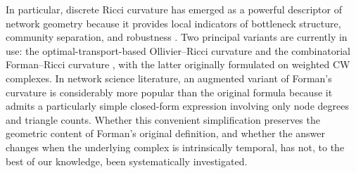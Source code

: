 \documentclass[
    pre,
    twocolumn,
    superscriptaddress,
    showpacs,
    nofootinbib,
    amsmath,
    amssymb,
    floatfix
]{revtex4-2}
\theoremstyle{plain} %
\theoremstyle{definition} %
\begin{document}
In particular, discrete Ricci curvature has emerged as a powerful
descriptor of network geometry because it provides local indicators of
bottleneck structure, community separation, and robustness
\cite{Ollivier2009,Sandhu2016,Sreejith2016,Samal2018}.  Two principal
variants are currently in use: the optimal-transport-based Ollivier--Ricci
curvature \cite{Ollivier2009} and the combinatorial Forman--Ricci
curvature \cite{Forman2003}, with the latter originally formulated on
weighted CW complexes. In network science literature, an
augmented variant of Forman's curvature
\cite{Sreejith2016,Samal2018} is considerably more popular than the original
formula because it admits a particularly simple closed-form expression involving
only node degrees and triangle counts.  Whether this convenient
simplification preserves the geometric content of Forman's original
definition, and whether the answer changes when the underlying
complex is intrinsically temporal, has not, to the best of our knowledge, been
systematically investigated.
\end{document}
